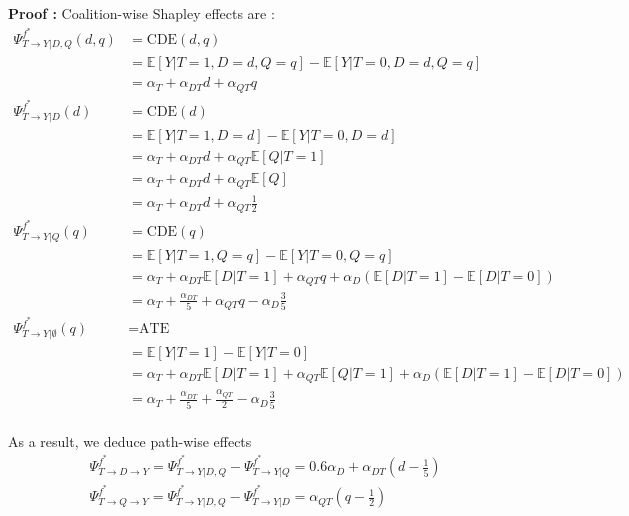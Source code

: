 \documentclass{article}
\theoremstyle{plain}
\theoremstyle{definition}
\theoremstyle{remark}
\newcommand{\effect}{\Psi}
\theoremstyle{mystyle}
\begin{document}
\textbf{Proof :} Coalition-wise Shapley effects are :
\begin{align*}
     \effect^{f^*}_{T \rightarrow Y | D, Q}(d,q)
     &= \text{CDE}(d,q) \\
     &= \mathbb{E}[Y|T=1,D=d,Q=q] - \mathbb{E}[Y|T=0,D=d,Q=q] \\ 
     &= \alpha_T + \alpha_{DT}d + \alpha_{QT}q \\
    \effect^{f^*}_{T \rightarrow Y | D}(d)
     &= \text{CDE}(d) \\
     &= \mathbb{E}[Y|T=1,D=d] - \mathbb{E}[Y|T=0,D=d] \\ 
     &= \alpha_T + \alpha_{DT}d + \alpha_{QT}\mathbb{E}[Q|T=1] \\
     &= \alpha_T + \alpha_{DT}d + \alpha_{QT}\mathbb{E}[Q] \\
     &= \alpha_T + \alpha_{DT}d + \alpha_{QT}\frac{1}{2} \\
    \effect^{f^*}_{T \rightarrow Y | Q}(q)
     &= \text{CDE}(q) \\
     &= \mathbb{E}[Y|T=1,Q=q] - \mathbb{E}[Y|T=0,Q=q] \\ 
     &= \alpha_T + \alpha_{DT}\mathbb{E}[D|T=1] + \alpha_{QT}q + \alpha_D(\mathbb{E}[D|T=1] - \mathbb{E}[D|T=0]) \\
     &= \alpha_T + \frac{\alpha_{DT}}{5} + \alpha_{QT}q - \alpha_D\frac{3}{5} \\
    \effect^{f^*}_{T \rightarrow Y | \emptyset}(q)
     &= \text{ATE} \\
     &= \mathbb{E}[Y|T=1] - \mathbb{E}[Y|T=0] \\ 
     &= \alpha_T + \alpha_{DT}\mathbb{E}[D|T=1] + \alpha_{QT}\mathbb{E}[Q|T=1] + \alpha_D(\mathbb{E}[D|T=1] - \mathbb{E}[D|T=0]) \\
     &= \alpha_T + \frac{\alpha_{DT}}{5} + \frac{\alpha_{QT}}{2} - \alpha_D\frac{3}{5} \\
\end{align*}

As a result, we deduce path-wise effects
\begin{align*}
    &\effect^{f^*}_{T \rightarrow D \rightarrow Y} = \effect^{f^*}_{T \rightarrow Y | D, Q} - \effect^{f^*}_{T \rightarrow Y | Q} = 0.6 \alpha_D + \alpha_{DT} (d - \frac{1}{5}) \\
    &\effect^{f^*}_{T \rightarrow Q \rightarrow Y} = \effect^{f^*}_{T \rightarrow Y | D, Q} - \effect^{f^*}_{T \rightarrow Y | D} = \alpha_{QT}(q - \frac{1}{2}) \\
\end{align*}
\end{document}
